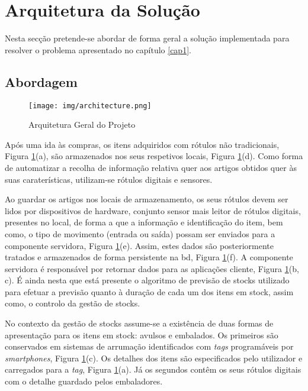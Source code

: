 %
%
\section{Arquitetura da Solução}\label{sec23}

Nesta secção pretende-se abordar de forma geral a solução implementada para resolver o problema apresentado no capítulo \ref{cap1}.

%
%
\subsection{Abordagem}\label{subsec231}

\begin{figure}[H]
	\centering
	\texttt{[image: img/architecture.png]}
	\caption{Arquitetura Geral do Projeto}
	\label{project-general-architecture}
\end{figure}

Após uma ida às compras, os itens adquiridos com rótulos não tradicionais, Figura \ref{project-general-architecture}(a), são armazenados nos seus respetivos locais, Figura \ref{project-general-architecture}(d). Como forma de automatizar a recolha de informação relativa quer aos artigos obtidos quer às suas caraterísticas, utilizam-se rótulos digitais e sensores.

Ao guardar os artigos nos locais de armazenamento, os seus rótulos devem ser lidos por dispositivos de hardware, conjunto sensor mais leitor de rótulos digitais, presentes no local, de forma a que a informação e identificação do item, bem como, o tipo de movimento (entrada ou saída) possam ser enviados para a componente servidora, Figura \ref{project-general-architecture}(e). Assim, estes dados são posteriormente tratados e armazenados de forma persistente na \acrfull{bd}, Figura \ref{project-general-architecture}(f). A componente servidora é responsável por retornar dados para as aplicações cliente, Figura \ref{project-general-architecture}(b, c). É ainda nesta que está presente o algoritmo de previsão de stocks utilizado para efetuar a previsão quanto à duração de cada um dos itens em stock, assim como, o controlo da gestão de stocks.

No contexto da gestão de stocks assume-se a existência de duas formas de apresentação para os itens em stock: avulsos e embalados. Os primeiros são conservados em sistemas de arrumação identificados com \textit{tags} programáveis por \textit{smartphones}, Figura \ref{project-general-architecture}(c). Os detalhes dos itens são especificados pelo utilizador e carregados para a \textit{tag}, Figura \ref{project-general-architecture}(a). Já os segundos contêm os seus rótulos digitais com o detalhe guardado pelos embaladores.

